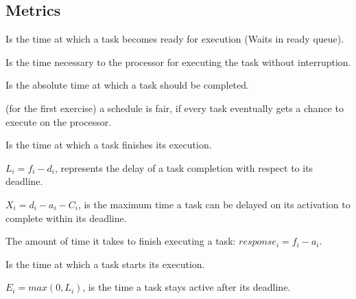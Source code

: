 \subsection{Metrics}

\begin{definition}
Is the time at which a task becomes ready for execution (Waits in ready queue).
\end{definition}

\begin{definition}
Is the time necessary to the processor for executing the task without interruption.
\end{definition}

\begin{definition}[Deadline $d_i$]
Is the absolute time at which a task should be completed.
\end{definition}

\begin{definition}
(for the first exercise) a schedule is fair, if every task eventually gets a chance to execute on the processor.
\end{definition}

\begin{definition}
Is the time at which a task finishes its execution.
\end{definition}

\begin{definition}[Lateness $L_i$]
$L_i = f_i - d_i$, represents the delay of a task 
completion with respect to its deadline.
\end{definition}

\begin{definition}
$X_i = d_i - a_i -C_i$, is the maximum time a task can be delayed on its activation to complete 
within its deadline.
\end{definition}

\begin{definition}
The amount of time it takes to finish executing a task: $response_i = f_i - a_i$.
\end{definition}

\begin{definition}
Is the time at which a task starts its execution.
\end{definition}

\begin{definition} 
$E_i = max(0, L_i)$, is the time a task stays active after its deadline.
\end{definition}

